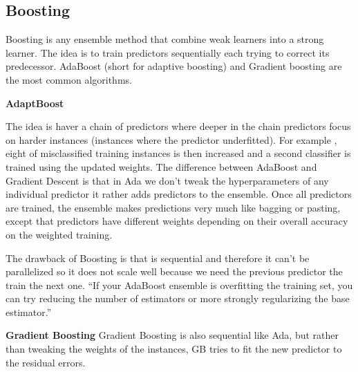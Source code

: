 \documentclass[12pt]{report}
\begin{document}
\subsection{Boosting}
Boosting is any ensemble method that combine weak learners into a strong learner. The idea is to train predictors sequentially each trying to correct its predecessor. AdaBoost (short for adaptive boosting) and Gradient boosting are the most common algorithms.

\textbf{AdaptBoost}

The idea is haver a chain of predictors where deeper in the chain predictors focus on harder instances (instances where the predictor underfitted). For example , eight of misclassified training instances is then increased and a second classifier is trained using the updated weights. The difference between AdaBoost and Gradient Descent is that in Ada we don't tweak the hyperparameters of any individual predictor it rather adds predictors to the ensemble. Once all predictors are trained, the ensemble makes predictions very much like bagging or pasting, except that predictors have different weights depending on their overall accuracy on the weighted training.

The drawback of Boosting is that is sequential and therefore it can't be parallelized so it does not scale well because we need the previous predictor the train the next one.
“If your AdaBoost ensemble is overfitting the training set, you can try reducing the number of estimators or more strongly regularizing the base estimator.”

\textbf{Gradient Boosting}
Gradient Boosting is also sequential like Ada, but rather than tweaking the weights of the instances, GB tries to fit the new predictor to the residual errors.
\end{document}
